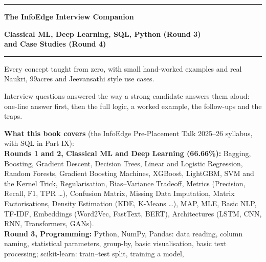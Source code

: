 \documentclass[11pt,openany]{book}
\begin{document}
\frontmatter
{}

\begin{titlepage}
\centering
\vspace*{1.2cm}
{\color{accent}\rule{\linewidth}{1.5pt}}\par\vspace{0.6cm}
{\Huge\bfseries\color{accent} The InfoEdge Interview Companion\par}
\vspace{0.4cm}
{\LARGE\bfseries Classical ML, Deep Learning, SQL, Python (Round 3)\\ and Case Studies (Round 4)\par}
\vspace{0.4cm}
{\color{accent}\rule{\linewidth}{1.5pt}}\par
\vspace{0.8cm}
{\large Every concept taught from zero, with small hand-worked examples and real\\
Naukri, 99acres and Jeevansathi style use cases.\par}
\vspace{0.4cm}
{\large Interview questions answered the way a strong candidate answers them aloud:\\
one-line answer first, then the full logic, a worked example, the follow-ups and the traps.\par}
\vspace{1cm}
\begin{tcolorbox}[colback=accentlight,colframe=accent,width=0.86\linewidth,arc=2pt,boxrule=0.6pt]
\small
\textbf{What this book covers} (the InfoEdge Pre-Placement Talk 2025--26 syllabus, with SQL in Part IX):\\[3pt]
\textbf{Rounds 1 and 2, Classical ML and Deep Learning (66.66\%):} Bagging, Boosting, Gradient Descent,
Decision Trees, Linear and Logistic Regression, Random Forests, Gradient Boosting Machines, XGBoost, LightGBM,
SVM and the Kernel Trick, Regularisation, Bias--Variance Tradeoff, Metrics (Precision, Recall, F1, TPR \dots),
Confusion Matrix, Missing Data Imputation, Matrix Factorisations, Density Estimation (KDE, K-Means \dots),
MAP, MLE, Basic NLP, TF-IDF, Embeddings (Word2Vec, FastText, BERT), Architectures (LSTM, CNN, RNN,
Transformers, GANs).\\[3pt]
\textbf{Round 3, Programming:} Python, NumPy, Pandas: data reading, column naming, statistical parameters,
group-by, basic visualisation, basic text processing; scikit-learn: train--test split, training a model,

\end{tcolorbox}
\end{titlepage}
\end{document}
